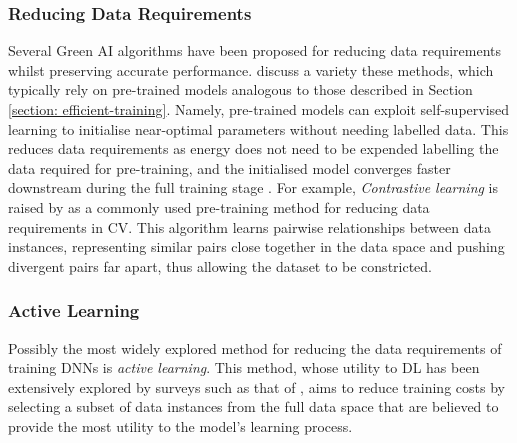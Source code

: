 \documentclass[a4paper, 11pt]{report}
\begin{document}
    \subsubsection{Reducing Data Requirements}

    Several Green AI algorithms have been proposed for reducing data requirements whilst preserving accurate performance. \citet{xu-2021} discuss a variety these methods, which typically rely on pre-trained models analogous to those described in Section \ref{section: efficient-training}. Namely, pre-trained models can exploit self-supervised learning to initialise near-optimal parameters without needing labelled data. This reduces data requirements as energy does not need to be expended labelling the data required for pre-training, and the initialised model converges faster downstream during the full training stage \citep{xu-2021}. For example, \emph{Contrastive learning} \citep{chen-2020} is raised by \citet{xu-2021} as a commonly used pre-training method for reducing data requirements in CV. This algorithm learns pairwise relationships between data instances, representing similar pairs close together in the data space and pushing divergent pairs far apart, thus allowing the dataset to be constricted.


    \subsubsection{Active Learning}
    \label{section: active-learning}

    Possibly the most widely explored method for reducing the data requirements of training DNNs is \emph{active learning}. This method, whose utility to DL has been extensively explored by surveys such as that of \citet{ren-2021}, aims to reduce training costs by selecting a subset of data instances from the full data space that are believed to provide the most utility to the model's learning process. 
\end{document}
